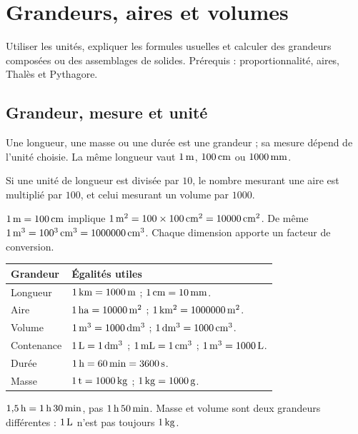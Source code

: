 \documentclass[../cours_3e.tex]{subfiles}
\begin{document}
\setcounter{chapter}{16}
\chapter{Grandeurs, aires et volumes}
\label{ch:mesures}
\begin{objectif}
Utiliser les unités, expliquer les formules usuelles et calculer des grandeurs composées ou des assemblages de solides. Prérequis : proportionnalité, aires, Thalès et Pythagore.
\end{objectif}
\section{Grandeur, mesure et unité}
Une longueur, une masse ou une durée est une grandeur ; sa mesure dépend de l'unité choisie. La même longueur vaut $1\,\mathrm{m}$, $100\,\mathrm{cm}$ ou $1000\,\mathrm{mm}$.
\begin{propriete}
Si une unité de longueur est divisée par $10$, le nombre mesurant une aire est multiplié par $100$, et celui mesurant un volume par $1000$.
\end{propriete}
\begin{demonstration}
$1\,\mathrm{m}=100\,\mathrm{cm}$ implique $1\,\mathrm{m^2}=100\times100\,\mathrm{cm^2}=10000\,\mathrm{cm^2}$.
De même $1\,\mathrm{m^3}=100^3\,\mathrm{cm^3}=1000000\,\mathrm{cm^3}$. Chaque dimension apporte un facteur de conversion.
\end{demonstration}
\begin{center}
\begin{tabularx}{\textwidth}{lX}
\toprule Grandeur & Égalités utiles\\\midrule
Longueur & $1\,\mathrm{km}=1000\,\mathrm{m}$ ; $1\,\mathrm{cm}=10\,\mathrm{mm}$.\\
Aire & $1\,\mathrm{ha}=10000\,\mathrm{m^2}$ ; $1\,\mathrm{km^2}=1000000\,\mathrm{m^2}$.\\
Volume & $1\,\mathrm{m^3}=1000\,\mathrm{dm^3}$ ; $1\,\mathrm{dm^3}=1000\,\mathrm{cm^3}$.\\
Contenance & $1\,\mathrm{L}=1\,\mathrm{dm^3}$ ; $1\,\mathrm{mL}=1\,\mathrm{cm^3}$ ; $1\,\mathrm{m^3}=1000\,\mathrm{L}$.\\
Durée & $1\,\mathrm{h}=60\,\mathrm{min}=3600\,\mathrm{s}$.\\
Masse & $1\,\mathrm{t}=1000\,\mathrm{kg}$ ; $1\,\mathrm{kg}=1000\,\mathrm{g}$.\\\bottomrule
\end{tabularx}
\end{center}
\begin{attention}
$1{,}5\,\mathrm{h}=1\,\mathrm{h}\,30\,\mathrm{min}$, pas $1\,\mathrm{h}\,50\,\mathrm{min}$. Masse et volume sont deux grandeurs différentes : $1\,\mathrm{L}$ n'est pas toujours $1\,\mathrm{kg}$.
\end{attention}
\end{document}
